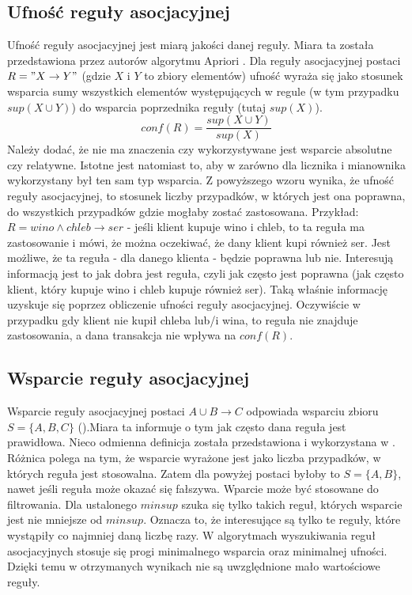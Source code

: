 \subsection{Ufność reguły asocjacyjnej}
\label{c224}
Ufność reguły asocjacyjnej jest miarą jakości danej reguły. Miara ta została przedstawiona przez autorów algorytmu Apriori \cite{Agrawal1994}. Dla reguły asocjacyjnej postaci \(R = "X\rightarrow Y"\) (gdzie \(X\) i \(Y\) to zbiory elementów) ufność wyraża się jako stosunek wsparcia sumy wszystkich elementów występujących w regule (w tym przypadku \(sup(X \cup Y)\)) do wsparcia poprzednika reguły (tutaj \(sup(X)\)). 
\[conf(R) = \frac{sup(X \cup Y)}{sup(X)}\]
Należy dodać, że nie ma znaczenia czy wykorzystywane jest wsparcie absolutne czy relatywne. Istotne jest natomiast to, aby w zarówno dla licznika i mianownika wykorzystany był ten sam typ wsparcia.
Z powyższego wzoru wynika, że ufność reguły asocjacyjnej, to stosunek liczby przypadków, w których jest ona poprawna, do wszystkich przypadków gdzie mogłaby zostać zastosowana.
Przykład: \(R = wino \wedge chleb \rightarrow ser\) - jeśli klient kupuje wino i chleb, to ta reguła ma zastosowanie i mówi, że można oczekiwać, że dany klient kupi również ser. Jest możliwe, że ta reguła - dla danego klienta - będzie poprawna lub nie. Interesują informacją jest to jak dobra jest reguła, czyli jak często jest poprawna (jak często klient, który kupuje wino i chleb kupuje również ser). Taką właśnie informację uzyskuje się poprzez obliczenie ufności reguły asocjacyjnej. Oczywiście w przypadku gdy klient nie kupił chleba lub/i wina, to reguła nie znajduje zastosowania, a dana transakcja nie wpływa na \(conf(R)\). 

\subsection{Wsparcie reguły asocjacyjnej}
\label{c225}
Wsparcie reguły asocjacyjnej postaci \(A \cup B \rightarrow C\) odpowiada wsparciu zbioru \(S = \{A, B, C\}\) (\cite{Agrawal}).Miara ta informuje o tym jak często dana reguła jest prawidłowa. Nieco odmienna definicja została przedstawiona i wykorzystana w \cite{Borgelt}. Różnica polega na tym, że wsparcie wyrażone jest jako liczba przypadków, w których reguła jest stosowalna. Zatem dla powyżej postaci byłoby to \(S = \{A, B\}\), nawet jeśli reguła może okazać się fałszywa. 
Wparcie może być stosowane do filtrowania. Dla ustalonego \(minsup\) szuka się tylko takich reguł, których wsparcie jest nie mniejsze od \(minsup\). Oznacza to, że interesujące są tylko te reguły, które wystąpiły co najmniej daną liczbę razy.
W algorytmach wyszukiwania reguł asocjacyjnych stosuje się progi minimalnego wsparcia oraz minimalnej ufności. Dzięki temu w otrzymanych wynikach nie są uwzględnione mało wartościowe reguły.

